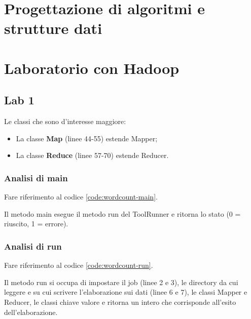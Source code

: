 \documentclass[italian,10pt,a4paper]{report}
\begin{document}
	\chapter{Progettazione di algoritmi e strutture dati}
	\chapter{Laboratorio con Hadoop}
	\section{Lab 1}
	
	Le classi che sono d'interesse maggiore:
	\begin{itemize}
		\item La classe \textbf{Map} (linee 44-55) estende Mapper;
		\item La classe \textbf{Reduce} (linee 57-70) estende Reducer.
	\end{itemize}
	\newpage
	\subsection{Analisi di main}
	Fare riferimento al codice \ref{code:wordcount-main}.
	
	Il metodo main esegue il metodo run del ToolRunner e ritorna lo stato (0 = riuscito, 1 = errore).
	\subsection{Analisi di run}
	Fare riferimento al codice \ref{code:wordcount-run}.
	
	Il metodo run si occupa di impostare il job (linee 2 e 3), le directory da cui leggere e su cui scrivere l'elaborazione sui dati (linee 6 e 7), le classi Mapper e Reducer, le classi chiave valore e ritorna un intero che corrisponde all'esito dell'elaborazione.
\end{document}
